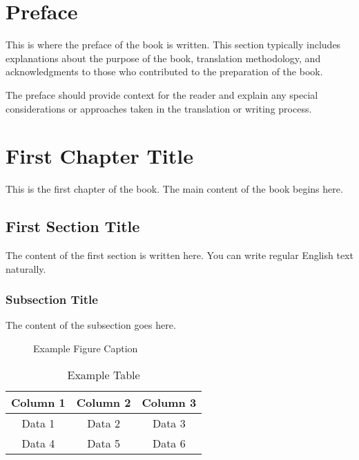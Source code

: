 \documentclass[12pt,a4paper,oneside]{book}
\begin{document}
\chapter*{Preface}

This is where the preface of the book is written. This section typically includes explanations about the purpose of the book, translation methodology, and acknowledgments to those who contributed to the preparation of the book.

The preface should provide context for the reader and explain any special considerations or approaches taken in the translation or writing process.

\tableofcontents



\mainmatter

\chapter{First Chapter Title}
\label{ch:chapter1}

This is the first chapter of the book. The main content of the book begins here.

\section{First Section Title}
\label{sec:section1}

The content of the first section is written here. You can write regular English text naturally.

\subsection{Subsection Title}

The content of the subsection goes here.

\begin{figure}[h]
\centering
\caption{Example Figure Caption}
\label{fig:example}
\end{figure}

\begin{table}[h]
\centering
\caption{Example Table}
\label{tab:example}
\begin{tabular}{|c|c|c|}
\hline
Column 1 & Column 2 & Column 3 \\
\hline
Data 1 & Data 2 & Data 3 \\
Data 4 & Data 5 & Data 6 \\
\hline
\end{tabular}
\end{table}
\end{document}

